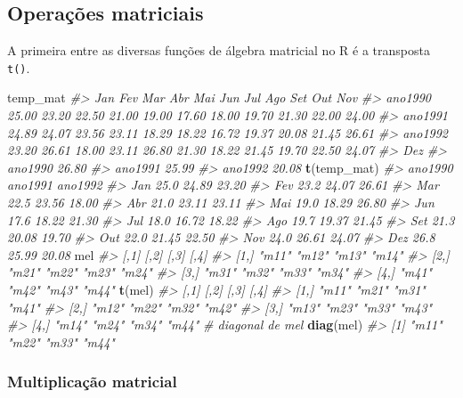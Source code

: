 \documentclass[]{book}
\newenvironment{Shaded}{\begin{snugshade}}{\end{snugshade}}
\newcommand{\KeywordTok}[1]{\textcolor[rgb]{0.13,0.29,0.53}{\textbf{#1}}}
\newcommand{\CommentTok}[1]{\textcolor[rgb]{0.56,0.35,0.01}{\textit{#1}}}
\newcommand{\NormalTok}[1]{#1}
\begin{document}
\subsection{Operações matriciais}\label{operacoes-matriciais}

A primeira entre as diversas funções de álgebra matricial no R é a
transposta \texttt{t()}.

\begin{Shaded}
\begin{Highlighting}[]
\NormalTok{temp_mat}
\CommentTok{#>           Jan   Fev   Mar   Abr   Mai   Jun   Jul   Ago   Set   Out   Nov}
\CommentTok{#> ano1990 25.00 23.20 22.50 21.00 19.00 17.60 18.00 19.70 21.30 22.00 24.00}
\CommentTok{#> ano1991 24.89 24.07 23.56 23.11 18.29 18.22 16.72 19.37 20.08 21.45 26.61}
\CommentTok{#> ano1992 23.20 26.61 18.00 23.11 26.80 21.30 18.22 21.45 19.70 22.50 24.07}
\CommentTok{#>           Dez}
\CommentTok{#> ano1990 26.80}
\CommentTok{#> ano1991 25.99}
\CommentTok{#> ano1992 20.08}
\KeywordTok{t}\NormalTok{(temp_mat)}
\CommentTok{#>     ano1990 ano1991 ano1992}
\CommentTok{#> Jan    25.0   24.89   23.20}
\CommentTok{#> Fev    23.2   24.07   26.61}
\CommentTok{#> Mar    22.5   23.56   18.00}
\CommentTok{#> Abr    21.0   23.11   23.11}
\CommentTok{#> Mai    19.0   18.29   26.80}
\CommentTok{#> Jun    17.6   18.22   21.30}
\CommentTok{#> Jul    18.0   16.72   18.22}
\CommentTok{#> Ago    19.7   19.37   21.45}
\CommentTok{#> Set    21.3   20.08   19.70}
\CommentTok{#> Out    22.0   21.45   22.50}
\CommentTok{#> Nov    24.0   26.61   24.07}
\CommentTok{#> Dez    26.8   25.99   20.08}
\NormalTok{mel}
\CommentTok{#>      [,1]  [,2]  [,3]  [,4] }
\CommentTok{#> [1,] "m11" "m12" "m13" "m14"}
\CommentTok{#> [2,] "m21" "m22" "m23" "m24"}
\CommentTok{#> [3,] "m31" "m32" "m33" "m34"}
\CommentTok{#> [4,] "m41" "m42" "m43" "m44"}
\KeywordTok{t}\NormalTok{(mel)}
\CommentTok{#>      [,1]  [,2]  [,3]  [,4] }
\CommentTok{#> [1,] "m11" "m21" "m31" "m41"}
\CommentTok{#> [2,] "m12" "m22" "m32" "m42"}
\CommentTok{#> [3,] "m13" "m23" "m33" "m43"}
\CommentTok{#> [4,] "m14" "m24" "m34" "m44"}
\CommentTok{# diagonal de mel}
\KeywordTok{diag}\NormalTok{(mel)}
\CommentTok{#> [1] "m11" "m22" "m33" "m44"}
\end{Highlighting}
\end{Shaded}

\subsubsection{Multiplicação matricial}\label{multiplicacao-matricial}
\end{document}
